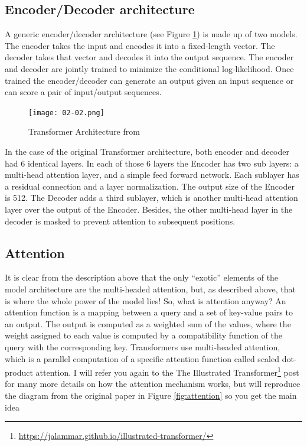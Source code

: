 \documentclass{article}
\begin{document}
\subsection{Encoder/Decoder architecture}

A generic encoder/decoder architecture (see Figure \ref{fig:transformer}) is made up of two models. The encoder takes the input and encodes it into a fixed-length vector. The decoder takes that vector and decodes it into the output sequence. The encoder and decoder are jointly trained to minimize the conditional log-likelihood. Once trained the encoder/decoder can generate an output given an input sequence or can score a pair of input/output sequences.

\begin{figure}
    \centering
    \texttt{[image: 02-02.png]}
    \caption{Transformer Architecture from \cite{vaswani2017attention}}
    \label{fig:transformer}
\end{figure}

In the case of the original Transformer architecture, both encoder and decoder had 6 identical layers. In each of those 6 layers the Encoder has two sub layers: a multi-head attention layer, and a simple feed forward network. Each sublayer has a residual connection and a layer normalization. The output size of the Encoder is 512. The Decoder adds a third sublayer, which is another multi-head attention layer over the output of the Encoder. Besides, the other multi-head layer in the decoder is masked to prevent attention to subsequent positions.

\subsection{Attention}

It is clear from the description above that the only “exotic” elements of the model architecture are the multi-headed attention, but, as described above, that is where the whole power of the model lies! So, what is attention anyway? An attention function is a mapping between a query and a set of key-value pairs to an output. The output is computed as a weighted sum of the values, where the weight assigned to each value is computed by a compatibility function of the query with the corresponding key. Transformers use multi-headed attention, which is a parallel computation of a specific attention function called scaled dot-product attention. I will refer you again to the The Illustrated Transformer\footnote{\url{https://jalammar.github.io/illustrated-transformer/}} post for many more details on how the attention mechanism works, but will reproduce the diagram from the original paper in Figure \ref{fig:attention} so you get the main idea
\end{document}
